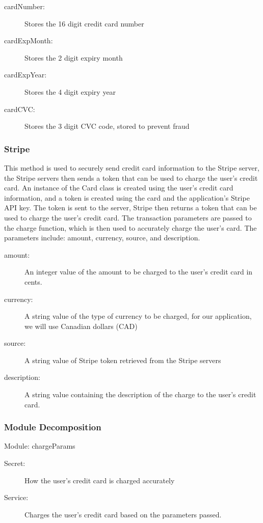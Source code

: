 \documentclass[12pt, titlepage]{article}
\begin{document}
\begin{description}
  \item[cardNumber:] Stores the 16 digit credit card number 
  \item[cardExpMonth:] Stores the 2 digit expiry month 
  \item[cardExpYear:] Stores the 4 digit expiry year
  \item[cardCVC:] Stores the 3 digit CVC code, stored to prevent fraud
\end{description}

\subsubsection{Stripe}
This method is used to securely send credit card information to the Stripe server, the Stripe servers then sends a token that can be used to charge the user's credit card. An instance of the Card class is created using the user's credit card information, and a token is created
using the card and the application's Stripe API key. The token is sent to the server, Stripe then returns a token that can be used to charge the user's credit card. The transaction parameters are passed to the charge function, which is then used to accurately charge the user's card.
The parameters include: amount, currency, source, and description.
  
\begin{description}
  \item[amount:] An integer value of the amount to be charged to the user's credit card in cents.
  \item[currency:] A string value of the type of currency to be charged, for our application, we will use Canadian dollars (CAD) 
  \item[source:] A string value of Stripe token retrieved from the Stripe servers 
  \item[description:] A string value containing the description of the charge to the user's credit card.
\end{description}

\subsubsection{Module Decomposition}
Module: chargeParams
\begin{description}
	\item[Secret:]How the user's credit card is charged accurately
	\item[Service:] Charges the user's credit card based on the parameters passed.
\end{description}
\end{document}
